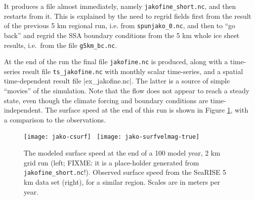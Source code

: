 It produces a file almost immediately, namely \verb|jakofine_short.nc|, and then restarts from it.  This is explained by the need to regrid fields first from the result of the previous 5 km regional run, i.e. from \verb|spunjako_0.nc|, and then to ``go back'' and regrid the SSA boundary conditions from the 5 km whole ice sheet results, i.e.~from the file \verb|g5km_bc.nc|.

At the end of the run the final file \verb|jakofine.nc| is produced, along with a time-series result file \verb|ts_jakofine.nc| with monthly scalar time-series, and a spatial time-dependent result file |ex_jakofine.nc|.  The latter is a source of simple ``movies'' of the simulation.  Note that the flow does not appear to reach a steady state, even though the climate forcing and boundary conditions are time-independent.  The surface speed at the end of this run is shown in Figure \ref{fig:jako-csurf}, with a comparison to the observations.

\begin{figure}[ht]
  \centering
  \texttt{[image: jako-csurf]} \, \texttt{[image: jako-surfvelmag-true]}
  \caption{The modeled surface speed at the end of a 100 model year, 2 km grid run (left; FIXME: it is a place-holder generated from \texttt{jakofine_short.nc}!).  Observed surface speed from the SeaRISE  5 km data set (right), for a similar region.  Scales are in meters per year.}
  \label{fig:jako-csurf}
\end{figure}


\begin{comment}

\subsection*{Plotting the results}

This is about Figure {fig:jako-csurf}.  We use  PyPISMTools.

To visualize the surface speed at the end of the 2km run, download PyPISMTools and do

  basemap-plot.py --singlerow -v csurf -o csurf.png jakofine.nc

To choose a colormap add option \verb|--colormap foo.cpt| or similar; some colormaps can 

  cp Greenland_5km_v1.1.nc gr5km_xy.nc
  ncrename -v x1,x -v y1,y gr5km_xy.nc 
  ncrename -d x1,x -d y1,y gr5km_xy.nc 
  ncks -d x,55,175 -d y,195,280 -v lat,lon,mapping,surfvelmag gr5km_xy.nc foo.nc
  basemap-plot.py --singlerow -v surfvelmag -o surfvelmag.png foo.nc

\end{comment}